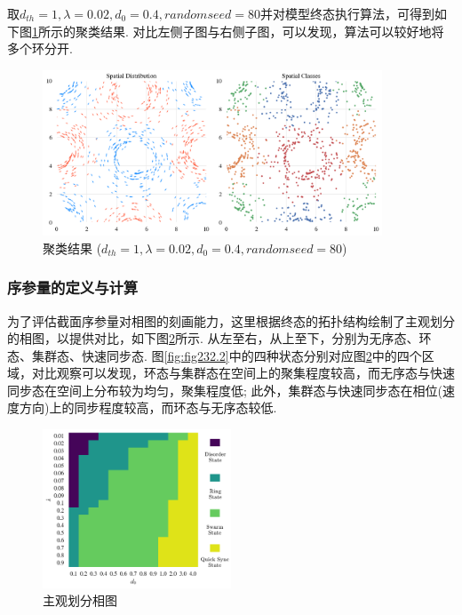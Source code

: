 \documentclass{article}
\begin{document}
取$d_{th}=1, \lambda=0.02, d_0=0.4, random seed=80$并对模型终态执行算法，可得到如下图\ref{fig:fig233.1}所示的聚类结果. 对比左侧子图与右侧子图，可以发现，算法可以较好地将多个环分开.

\begin{figure}[H]
	\centering
	\includegraphics[width=0.9\textwidth]{./figs/ClusteringResult.png}
	\vspace{-0.4cm}
	\caption{聚类结果 ($d_{th}=1, \lambda=0.02, d_0=0.4, random seed=80$)}
	\label{fig:fig233.1}
\end{figure}

\subsubsection{序参量的定义与计算}

为了评估截面序参量对相图的刻画能力，这里根据终态的拓扑结构绘制了主观划分的相图，以提供对比，如下图\ref{fig:fig234.1}所示. 从左至右，从上至下，分别为无序态、环态、集群态、快速同步态. 图\ref{fig:fig232.2}中的四种状态分别对应图\ref{fig:fig234.1}中的四个区域，对比观察可以发现，环态与集群态在空间上的聚集程度较高，而无序态与快速同步态在空间上分布较为均匀，聚集程度低; 此外，集群态与快速同步态在相位(速度方向)上的同步程度较高，而环态与无序态较低.

\begin{figure}[H]
	\centering
	\includegraphics[width=0.5\textwidth]{./figs/subjectiveOp.png}
	\vspace{-0.5cm}
	\caption{主观划分相图}
	\label{fig:fig234.1}
\end{figure}
\vspace{-0.5cm}
\end{document}
